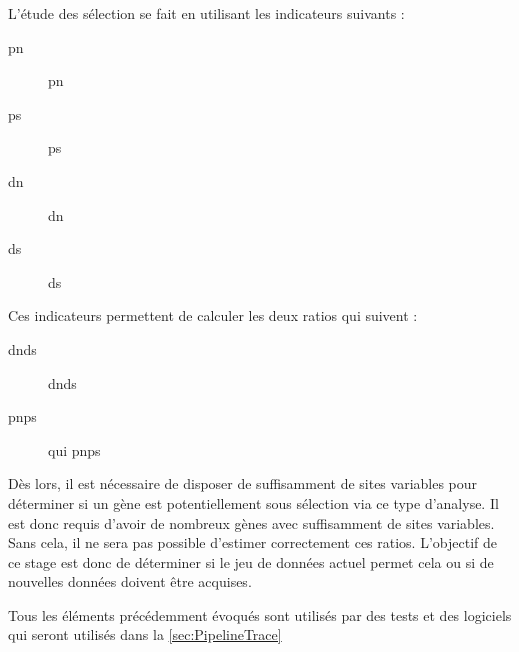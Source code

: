 \documentclass[../main]{subfiles} %
\begin{document}
L'étude des sélection se fait en utilisant les indicateurs suivants :


\begin{description}
    \item [\acrshort{pn}] \acrlong{pn}
    \item [\acrshort{ps}] \acrlong{ps}
    \item [\acrshort{dn}] \acrlong{dn}
    \item [\acrshort{ds}] \acrlong{ds}
\end{description}


Ces indicateurs permettent de calculer les deux ratios qui suivent :
\begin{description}
    \item [\acrshort{dnds}] \acrlong{dnds}
    \item [\acrshort{pnps}] qui \acrlong{pnps}
\end{description}

Dès lors, il est nécessaire de disposer de suffisamment de sites variables pour déterminer si un gène est potentiellement sous sélection via ce type d'analyse. Il est donc requis d'avoir de nombreux gènes avec suffisamment de sites variables. Sans cela, il ne sera pas possible d'estimer correctement ces ratios. 
L'objectif de ce stage est donc de déterminer si le jeu de données actuel permet cela ou si de nouvelles données doivent être acquises.

Tous les éléments précédemment évoqués sont utilisés par des tests et des logiciels qui seront utilisés dans la \cref{sec:PipelineTrace}


\end{document}
